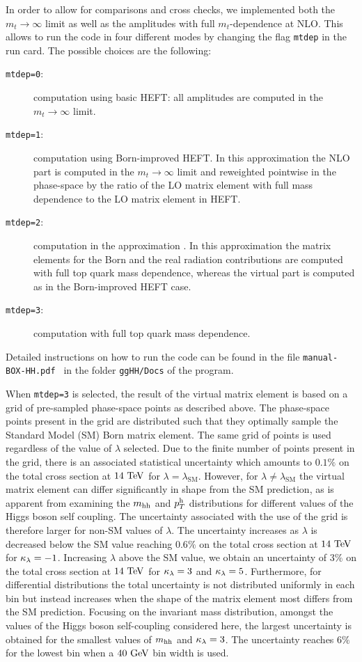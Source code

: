 In order to allow for comparisons and cross checks, we implemented
both the $m_t\to\infty$ limit as well as the  amplitudes with full $m_t$-dependence at
NLO. This allows to run the code in four different modes by changing
the flag {\tt mtdep} in the \powhegbox{} run card. The possible
choices are the following:
\begin{description}
 \item[{\tt mtdep=0}:]{computation using basic HEFT: all amplitudes
   are computed in the $m_t\to\infty$ limit.}
\item[{\tt mtdep=1}:]{computation using Born-improved HEFT. In this
   approximation the NLO part is computed in the $m_t\to\infty$ limit
   and reweighted pointwise in the phase-space by the ratio of the LO matrix
   element with full mass dependence to  the LO matrix
   element in HEFT.}
 \item[{\tt mtdep=2}:]{computation in the approximation \ftapprox. In
   this approximation the matrix elements for the Born and the real
   radiation contributions are computed with full top quark mass dependence, whereas the virtual part is
   computed as in the Born-improved HEFT case. }
 \item[{\tt mtdep=3}:]{computation with full top quark mass dependence.}
\end{description}
Detailed instructions on how to run the code can be found in the
file {\tt manual-BOX-HH.pdf } in the folder {\tt ggHH/Docs} of the program.

When {\tt mtdep=3} is selected, the result of the virtual matrix element is based on a grid of pre-sampled phase-space points as described above. The phase-space points present in the grid are distributed such that they optimally sample the Standard Model (SM) Born matrix element. The same grid of points is used regardless of the value of $\lambda$ selected. Due to the finite number of points present in the grid, there is an associated statistical uncertainty which amounts to $0.1\%$ on the total cross section at $14\ \TeV$ for $\lambda=\lambda_\mathrm{SM}$. However, for $\lambda \neq \lambda_\mathrm{SM}$ the virtual matrix element can differ significantly in shape from the SM prediction, as is apparent from examining the $m_{\mathrm{hh}}$ and $p_T^{\mathrm{h}}$ distributions for different values of the Higgs boson self coupling. The uncertainty associated with the use of the grid is therefore larger for non-SM values of $\lambda$. The uncertainty increases as $\lambda$ is decreased below the SM value reaching $0.6\%$ on the total cross section at $14\ \TeV$ for $\kappa_{\lambda} = -1$. Increasing $\lambda$ above the SM value, we obtain an uncertainty of $3\%$ on the total cross section at $14\ \TeV$ for $\kappa_{\lambda} = 3$ and  $\kappa_{\lambda} = 5$. Furthermore, for differential distributions the total uncertainty is not distributed uniformly in each bin but instead increases when the shape of the matrix element most differs from the SM prediction. Focusing on the invariant mass distribution, amongst the values of the Higgs boson self-coupling considered here, the largest uncertainty is obtained for the smallest values of $m_{\mathrm{hh}}$ and $\kappa_{\lambda}=3$. The uncertainty reaches $6\%$ for the lowest bin when a $40\ \mathrm{GeV}$ bin width is used.
